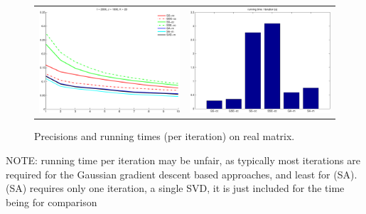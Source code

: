 \documentclass{article}
\begin{document}
\begin{figure}[h!]
\centering
\begin{tabular}{cc}
\includegraphics[scale=0.4]{figs/prec_DS2_I2000_J1000_1.pdf}&
\includegraphics[scale=0.4]{figs/time_DS2_I2000_J1000_1.pdf}
\end{tabular}
\caption{Precisions and running times (per iteration) on real matrix.\label{fig:real_results}}
\end{figure}

NOTE: running time per iteration may be unfair, as typically most iterations are required for 
the Gaussian gradient descent based approaches, and least for (SA). (SA) requires only one iteration,
a single SVD, it is just included for the time being for comparison
\end{document}
